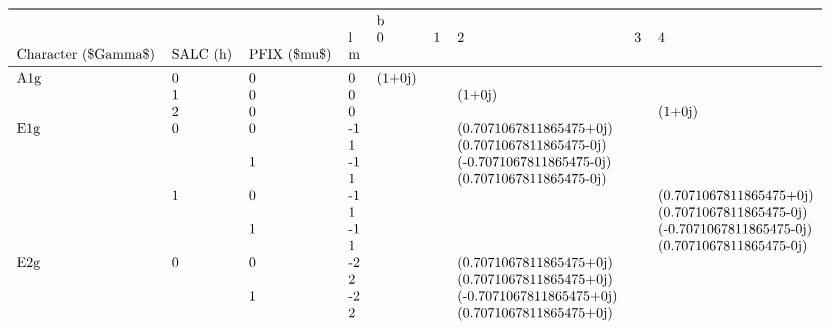 \documentclass[letterpaper,table,10pt,english]{jupyterBook}
\begin{document}
\begin{figure}[htbp]
\centering
\capstart
\begin{equation*}
\begin{split}\begin{tabular}{lllllllll}
\toprule
    &   &   & {} & \multicolumn{5}{l}{b} \\
    &   &   & l &       0 & 1 &                         2 & 3 &                         4 \\
Character (\$\textbackslash Gamma\$) & SALC (h) & PFIX (\$\textbackslash mu\$) & m &         &   &                           &   &                           \\
\midrule
A1g & 0 & 0 &  0 &  (1+0j) &   &                           &   &                           \\
    & 1 & 0 &  0 &         &   &                    (1+0j) &   &                           \\
    & 2 & 0 &  0 &         &   &                           &   &                    (1+0j) \\
E1g & 0 & 0 & -1 &         &   &   (0.7071067811865475+0j) &   &                           \\
    &   &   &  1 &         &   &   (0.7071067811865475-0j) &   &                           \\
    &   & 1 & -1 &         &   &  (-0.7071067811865475-0j) &   &                           \\
    &   &   &  1 &         &   &   (0.7071067811865475-0j) &   &                           \\
    & 1 & 0 & -1 &         &   &                           &   &   (0.7071067811865475+0j) \\
    &   &   &  1 &         &   &                           &   &   (0.7071067811865475-0j) \\
    &   & 1 & -1 &         &   &                           &   &  (-0.7071067811865475-0j) \\
    &   &   &  1 &         &   &                           &   &   (0.7071067811865475-0j) \\
E2g & 0 & 0 & -2 &         &   &   (0.7071067811865475+0j) &   &                           \\
    &   &   &  2 &         &   &   (0.7071067811865475+0j) &   &                           \\
    &   & 1 & -2 &         &   &  (-0.7071067811865475+0j) &   &                           \\
    &   &   &  2 &         &   &   (0.7071067811865475+0j) &   &                           \\

\end{tabular}
\end{split}
\end{equation*}
\end{figure}
\end{document}

